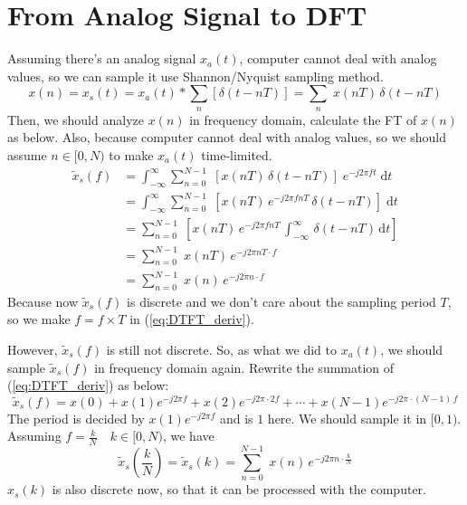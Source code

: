 \documentclass{article}
\begin{document}
\section{From Analog Signal to DFT}
Assuming there's an analog signal $x_a(t)$, computer cannot deal with analog values, so we can sample it use Shannon/Nyquist sampling method. 
\begin{equation}
x(n) = x_s(t) =  x_a(t) * \sum_{n} \left[ \delta(t- nT) \right] = \sum_{n} \; x(nT) \, \delta(t - nT)
\label{eq:Sampling_Mod}
\end{equation}
Then, we should analyze $x(n)$ in frequency domain, calculate the FT of $x(n)$ as below. Also, because computer cannot deal with analog values, so we should assume $n \in [0, N)$ to make $x_a(t)$ time-limited.
\begin{equation}
\begin{aligned}
	\widetilde{x}_s(f) &= \int_{- \infty}^{\infty} \sum_{n = 0}^{N - 1} \; \left[  x(nT) \, \delta(t - nT) \right] \; e^{-j 2\pi ft}\; \mathrm{d} t \\
	&= \int_{- \infty}^{\infty} \sum_{n = 0}^{N - 1} \; \left[  x(nT)  \, e^{-j 2\pi f nT} \, \delta(t - nT) \right] \; \mathrm{d} t \\
	&= \sum_{n = 0}^{N - 1} \; \left[  x(nT)  \, e^{-j 2\pi f nT} \, \int_{- \infty}^{\infty} \, \delta(t - nT) \, \mathrm{d} t  \right]\\
	&= \sum_{n = 0}^{N - 1} \; x(nT)  \, e^{-j 2\pi nT \cdot f} \\ 
	&= \sum_{n = 0}^{N - 1} \; x(n)  \, e^{-j 2\pi n \cdot f}
\end{aligned}
\label{eq:DTFT_deriv}
\end{equation}
Because now $\widetilde{x}_s(f)$ is discrete and we don't care about the sampling period $T$, so we make $f = f \times T$ in (\ref{eq:DTFT_deriv}).

However, $\widetilde{x}_s(f)$ is still not discrete. So, as what we did to $x_a(t)$, we should sample $\widetilde{x}_s(f)$ in frequency domain again. Rewrite the summation of (\ref{eq:DTFT_deriv}) as below:
$$
\widetilde{x}_s(f) = x(0) + x(1)e^{-j 2\pi f} + x(2)e^{-j 2\pi \cdot 2f} + \cdots + x(N - 1) e^{-j 2\pi \cdot (N - 1)\,f}
$$
The period is decided by $x(1)e^{-j 2\pi f}$ and is $1$ here. We should sample it in $[0, 1)$. Assuming $f = \frac{k}{N} \quad k \in [0, N)$, we have
\begin{equation*}
\widetilde{x}_s(\frac{k}{N}) = \widetilde{x}_s(k) = \sum_{n = 0}^{N - 1} \; x(n)  \, e^{-j 2\pi n \cdot \frac{k}{N}}
\label{eq:DFT}
\end{equation*}
$x_s(k)$ is also discrete now, so that it can be processed with the computer.
\end{document}
